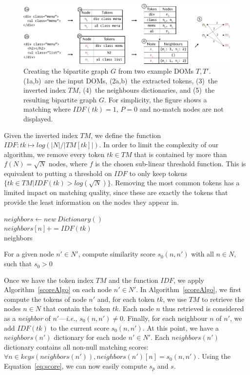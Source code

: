 \begin{figure}
    \centering
    \includegraphics[width=\linewidth]{tree-matching/explanation/inverted_index}
    \caption{Creating the bipartite graph $G$ from two example DOMs $T,T'$. (1a,b)~are the input DOMs, (2a,b)~the extracted tokens, (3)~the inverted index $TM$, (4)~the neighbours dictionaries, and (5)~the resulting bipartite graph $G$. For simplicity, the figure shows a matching where $IDF(tk)=1$, $P=0$ and no-match nodes are not displayed.}\label{fig:inverted_index}
\end{figure}

Given the inverted index $TM$, we define the function $IDF: tk \mapsto log(|N|/|TM[tk]|)$.
In order to limit the complexity of our algorithm, we remove every token $tk \in TM$ that is contained by more than $f(N)=\sqrt{N}$ nodes, where $f$ is the chosen sub-linear threshold function.
This is equivalent to putting a threshold on $IDF$ to only keep tokens $\{tk \in TM |IDF(tk) > log(\sqrt{N})\}$.
Removing the most common tokens has a limited impact on matching quality, since these are exactly the tokens that provide the least information on the nodes they appear in.

\begin{algorithm}
\SetAlgoLined
{}
$neighbors \gets new\ Dictionary()$\\
 {
     {
        $neighbors[n] += IDF(tk)$\\
    }
}
\Return neighbors
\caption{For a given node $n'\in N'$, compute similarity score $s_0(n,n')$ with all $n\in N$, such that $s_0 > 0$}\label{scoreAlgo}
\end{algorithm}

Once we have the token index $TM$ and the function $IDF$, we apply Algorithm~\ref{scoreAlgo} on each node $n' \in N'$.
In Algorithm~\ref{scoreAlgo}, we first compute the tokens of node $n'$ and, for each token $tk$, we use $TM$ to retrieve the nodes $n \in N$ that contain the token $tk$.
Each node $n$ thus retrieved is considered as a \textit{neighbor} of $n'$---\emph{i.e.}, $s_0(n,n') \neq 0$.
Finally, for each neighbour $n$ of $n'$, we add $IDF(tk)$ to the current score $s_0(n,n')$.
At this point, we have a $neighbors(n')$ dictionary for each node $n' \in N'$.
Each $neighbors(n')$ dictionary contains all non-null matching scores: $\forall n \in keys(neighbors(n')), neighbors(n')[n] = s_0(n,n')$.
Using the Equation~\ref{eq:score}, we can now easily compute $s_{p}$ and $s$.

